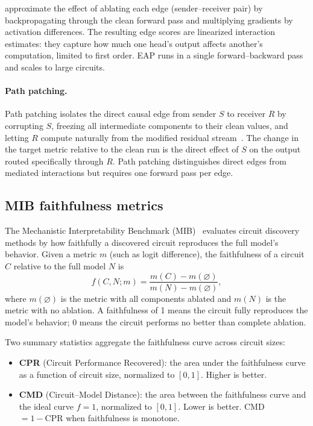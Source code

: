 \citet{syed2023attribution} approximate the effect of ablating each
edge (sender--receiver pair) by backpropagating through the clean
forward pass and multiplying gradients by activation differences. The
resulting edge scores are linearized interaction estimates: they
capture how much one head's output affects another's computation,
limited to first order. EAP runs in a single forward--backward pass and
scales to large circuits.

\paragraph{Path patching.}

Path patching isolates the direct causal edge from sender $S$ to
receiver $R$ by corrupting $S$, freezing all intermediate components to
their clean values, and letting $R$ compute naturally from the modified
residual stream~\citep{wang2022ioi}. The change in the target metric
relative to the clean run is the direct effect of $S$ on the output
routed specifically through $R$. Path patching distinguishes direct
edges from mediated interactions but requires one forward pass per edge.

\subsection{MIB faithfulness metrics}
\label{sec:mib-metrics}

The Mechanistic Interpretability Benchmark
(MIB)~\citep{mueller2025mib} evaluates circuit discovery methods by how
faithfully a discovered circuit reproduces the full model's behavior.
Given a metric $m$ (such as logit difference), the faithfulness of a
circuit $C$ relative to the full model $N$ is
\begin{equation}
  f(C, N; m) = \frac{m(C) - m(\varnothing)}{m(N) - m(\varnothing)},
  \label{eq:faithfulness}
\end{equation}
where $m(\varnothing)$ is the metric with all components ablated and
$m(N)$ is the metric with no ablation. A faithfulness of 1 means the
circuit fully reproduces the model's behavior; 0 means the circuit
performs no better than complete ablation.

Two summary statistics aggregate the faithfulness curve across circuit
sizes:

\begin{itemize}
\item \textbf{CPR} (Circuit Performance Recovered): the area under the
  faithfulness curve as a function of circuit size, normalized to $[0,1]$.
  Higher is better.

\item \textbf{CMD} (Circuit--Model Distance): the area between the
  faithfulness curve and the ideal curve $f = 1$, normalized to $[0,1]$.
  Lower is better. CMD $= 1 - \text{CPR}$ when faithfulness is monotone.
\end{itemize}
